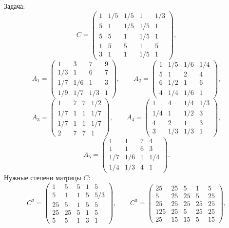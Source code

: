Задача:
$$C= \begin{pmatrix}
1 & 1/5 & 1/5 & 1 & 1/3\\
5 & 1 & 1/5 & 1/5 & 1\\
5 & 5 & 1 & 1/5 & 1\\
1 & 5 & 5 & 1 & 5\\
3 & 1 & 1 & 1/5 & 1
\end{pmatrix},
$$
$$A_1= \begin{pmatrix}
1 & 3 & 7 & 9\\
1/3 & 1 & 6 & 7\\
1/7 & 1/6 & 1 & 3\\
1/9 & 1/7 & 1/3 & 1
\end{pmatrix},
\qquad
A_2= \begin{pmatrix}
1 & 1/5 & 1/6 & 1/4\\
5 & 1 & 2 & 4\\
6 & 1/2 & 1 & 6\\
4 & 1/4 & 1/6 & 1
\end{pmatrix},
$$
$$A_3= \begin{pmatrix}
1 & 7 & 7 & 1/2\\
1/7 & 1 & 1 & 1/7\\
1/7 & 1 & 1 & 1/7\\
2 & 7 & 7 & 1
\end{pmatrix},
\qquad
A_4= \begin{pmatrix}
1 & 4 & 1/4 & 1/3\\
1/4 & 1 & 1/2 & 3\\
4 & 2 & 1 & 3\\
3 & 1/3 & 1/3 & 1
\end{pmatrix},
$$
$$A_5= \begin{pmatrix}
1 & 1 & 7 & 4\\
1 & 1 & 6 & 3\\
1/7 & 1/6 & 1 & 1/4\\
1/4 & 1/3 & 4 & 1
\end{pmatrix}.
$$
Нужные степени матрицы $C$:
$$C^2 = \begin{pmatrix}
1 & 5 & 5 & 1 & 5\\
5 & 1 & 1 & 5 & 5/3\\
25 & 5 & 1 & 5 & 5\\
25 & 25 & 5 & 1 & 5\\
5 & 5 & 1 & 3 & 1
\end{pmatrix},
\qquad
C^3 = \begin{pmatrix}
25 & 25 & 5 & 1 & 5\\
5 & 25 & 25 & 5 & 25\\
25 & 25 & 25 & 25 & 25\\
125 & 25 & 5 & 25 & 25\\
25 & 15 & 15 & 5 & 15
\end{pmatrix},
$$
